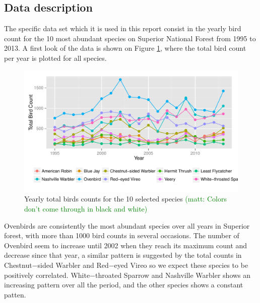 \documentclass[a4paper]{article}
\newcommand{\matt}[1]{\textcolor{green}{(matt: #1)}}
\begin{document}
\subsection{Data description}
The specific data set which it is used in this report consist in the yearly bird count for the 10 most abundant species on Superior National Forest from 1995 to 2013.  A first look of the data is shown on Figure \ref{figtr}, where the total bird count per year is plotted for all species. 
\begin{figure}[hbpt]
\centering
\includegraphics[width =\textwidth]{rawtrend}
 \vspace{-.5in}
\caption{Yearly total birds counts for the 10 selected species \label{figtr} \matt{Colors don't come through in black and white}}
\end{figure}

Ovenbirds are consistently the most abundant species over all years in Superior forest,  with more than 1000 bird counts in several occasions. The number of Ovenbird seem to increase until 2002 when they reach its maximum count and decrease since that year, a similar pattern is suggested by the total counts in Chestnut−sided Warbler and Red−eyed Vireo so we expect these species to be positively correlated.  White−throated Sparrow and Nashville Warbler shows an increasing pattern over all the period, and the other species shows a constant patten.  
%
\end{document}
